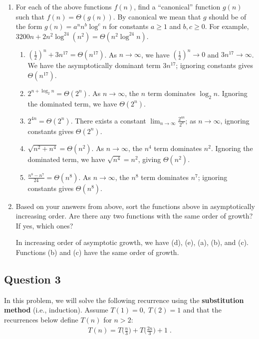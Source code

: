 \begin{enumerate}
    \item For each of the above functions $f(n)$, find a ``canonical'' function $g(n)$ such that $f(n) = \Theta(g(n))$. By canonical we mean that $g$ should be of the form $g(n) = a^n n^b \log^c n$ for constants $a\ge 1$ and $b,c\ge 0$. For example,  $3200n + 2n^2 \log^{24} (n^2) = \Theta(n^2\log^{24} n)$.

\begin{solution}
\begin{enumerate}
\item$\left(\frac{1}{2}\right)^n+3n^{17}=\Theta(n^{17})$. As $n\to\infty$, we have $\left(\frac{1}{2}\right)^n\to 0$ and $3n^{17}\to\infty$. We have the asymptotically dominant term $3n^{17}$; ignoring constants gives $\Theta(n^{17})$.
\item$2^{n+\log_2{n}}=\Theta(2^n)$. As $n\to\infty$, the $n$ term dominates $\log_2{n}$. Ignoring the dominated term, we have $\Theta(2^n)$.
\item$2^{4n}=\Theta(2^n)$. There exists a constant $\lim_{n\to\infty}{\frac{2^{4n}}{2^n}}$; as $n\to\infty$, ignoring constants gives $\Theta(2^n)$.
\item$\sqrt{n^2+n^4}=\Theta(n^2)$. As $n\to\infty$, the $n^4$ term dominates $n^2$. Ignoring the dominated term, we have $\sqrt{n^4}=n^2$, giving $\Theta(n^2)$.
\item$\frac{n^8-n^7}{24}=\Theta(n^8)$. As $n\to\infty$, the $n^8$ term dominates $n^7$; ignoring constants gives $\Theta(n^8)$.
\end{enumerate}
\end{solution}
\item Based on your answers from above, sort the functions above in asymptotically increasing order. Are there any two functions with the same order of growth? If yes, which ones?
\begin{solution}
In increasing order of asymptotic growth, we have (d), (e), (a), (b), and (c). Functions (b) and (c) have the same order of growth.
\end{solution}
\end{enumerate}
\newpage
\subsection*{Question 3}
\label{question:3}
In this problem, we will solve the following recurrence using the \textbf{substitution method} (i.e., induction). Assume $T(1)=0,\; T(2)=1$ and that the recurrences below define $T(n)$ for $n>2$:
\begin{align}
T(n) = T\Big(\frac{n}{3}\Big)+T\Big(\frac{2n}{3}\Big)+1\;. \label{eq:recurrence}
\end{align}

